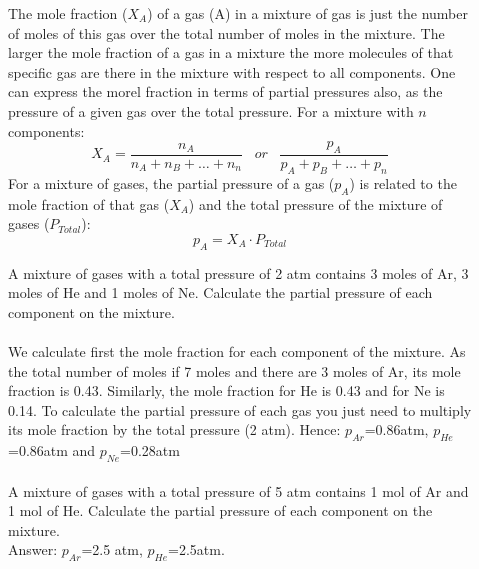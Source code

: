 \documentclass[main.tex]{subfiles}
\begin{document}
\begin{description}
\item[] The mole fraction ($X_A$) of a gas (A) in a mixture of gas is just the number of moles of this gas over the total number of moles in the mixture. The larger the mole fraction of a gas in a mixture the more molecules of that specific gas are there in the mixture with respect to all components. One can express the morel fraction in terms of partial pressures also, as the pressure of a given gas over the total pressure. For a mixture with $n$ components:
\begin{equation*}
\boxed{  X_A = \frac{n_A}{n_A + n_B + \dots + n_n}\;\; \;    or\;\; \;   \frac{p_A}{p_A + p_B + \dots + p_n} }
\end{equation*}
For a mixture of gases, the partial pressure of a gas ($p_A$) is related to the mole fraction of that gas ($X_A$) and the total pressure of the mixture of gases ($P_{Total}$):
\begin{equation*}
\boxed{  p_A=X_A\cdot P_{Total}}
\end{equation*}
\begin{example} %
A mixture of gases with a total pressure of 2 atm contains 3 moles of Ar, 3 moles of He and 1 moles of Ne. Calculate the partial pressure of each component on the mixture. 
\\
\\
We calculate first the mole fraction for each component of the mixture. As the total number of moles if 7 moles and there are 3 moles of Ar, its mole fraction is 0.43. Similarly, the mole fraction for He is 0.43 and for Ne is 0.14. To calculate the partial pressure of each gas you just need to multiply its mole fraction by the total pressure (2 atm). Hence: $p_{Ar}$=0.86atm, $p_{He}$=0.86atm and $p_{Ne}$=0.28atm
\\
\faDiamond\ \\
A mixture of gases with a total pressure of 5 atm contains 1 mol of Ar and 1 mol of He. Calculate the partial pressure of each component on the mixture. 
\\
\flushright Answer: $p_{Ar}$=2.5 atm, $p_{He}$=2.5atm.
\end{example}%


\end{description}
\end{document}
